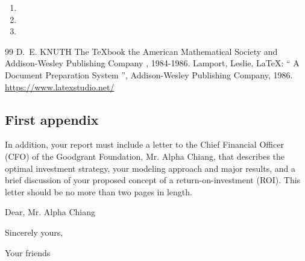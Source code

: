 \documentclass[twoside,12pt]{article}
\begin{document}
\begin{enumerate}
    \item \lipsum[4][1-3]

    \item \lipsum[4][1-3]

    \item \lipsum[4][1-3]
\end{enumerate}

\newpage
\thispagestyle{empty}
\begin{thebibliography}{99}
 D.~E. KNUTH   The \TeX{}book  the American
Mathematical Society and Addison-Wesley
Publishing Company , 1984-1986.
Lamport, Leslie,  \LaTeX{}: `` A Document Preparation System '',
Addison-Wesley Publishing Company, 1986.
\url{https://www.latexstudio.net/}
\end{thebibliography}
\newpage

\begin{appendices}
    \section{First appendix}

In addition, your report must include a letter to the Chief Financial Officer (CFO) of the Goodgrant Foundation, Mr. Alpha Chiang, that describes the optimal investment strategy, your modeling approach and major results, and a brief discussion of your proposed concept of a return-on-investment (ROI). This letter should be no more than two pages in length.

Dear, Mr. Alpha Chiang

\lipsum[1-2]

\vspace{\parskip}

Sincerely yours,

Your friends
\end{appendices}
\end{document}
